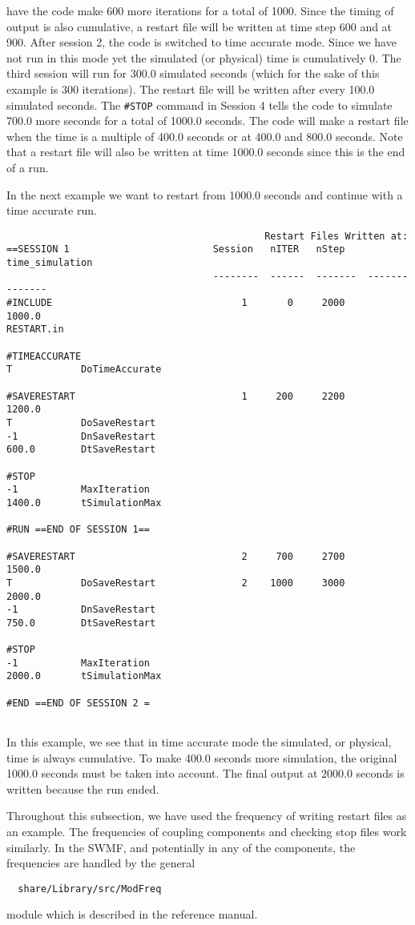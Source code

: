 have the code make 600 more iterations for a total of 1000.  Since the timing
of output is also cumulative, a restart file will be written at time step 600
and at 900.
After session 2, the code is switched to time accurate mode.  Since we
have not run in this mode yet the simulated (or physical) time is cumulatively
0.  The third session will run for 300.0 simulated seconds (which for the
sake of this example is 300 iterations).  The restart file will be written
after every 100.0 simulated seconds.
The {\tt \#STOP} command in Session 4 tells the code to simulate  700.0 more 
seconds for a total of 1000.0 seconds.  The code will make a restart file
when the time is a multiple of 400.0 seconds or at 400.0 and 800.0 seconds.
Note that a restart file will also be written at time 1000.0
seconds since this is the end of a run.

In the next example we want to restart from 1000.0 seconds 
and continue with a time accurate run.
\begin{verbatim}
                                             Restart Files Written at:
==SESSION 1                         Session   nITER   nStep    time_simulation
                                    --------  ------  -------  --------------
#INCLUDE                                 1       0     2000          1000.0
RESTART.in

#TIMEACCURATE
T            DoTimeAccurate  

#SAVERESTART                             1     200     2200          1200.0
T            DoSaveRestart
-1           DnSaveRestart
600.0        DtSaveRestart

#STOP
-1           MaxIteration
1400.0       tSimulationMax

#RUN ==END OF SESSION 1== 

#SAVERESTART                             2     700     2700          1500.0
T            DoSaveRestart               2    1000     3000          2000.0
-1           DnSaveRestart
750.0        DtSaveRestart

#STOP
-1           MaxIteration
2000.0       tSimulationMax

#END ==END OF SESSION 2 = 
                          
\end{verbatim}
In this example, we see that in time accurate mode the simulated, or
physical, time is always cumulative.  To make 400.0 seconds more simulation,
the original 1000.0 seconds must be taken into account.  The final output 
at 2000.0 seconds is written because the run ended.

Throughout this subsection, we have used the frequency of writing restart files
as an example.  The frequencies of coupling components and checking stop
files work similarly. In the SWMF, and potentially in any of the
components, the frequencies are handled by the general
\begin{verbatim}
  share/Library/src/ModFreq
\end{verbatim}
module which is described in the reference manual.

%
